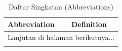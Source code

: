 \documentclass{elsinta}
\begin{document}
\section{\ReferencesTitle}

\renewcommand{\refname}{}




\section{\AbbrevTitle}

\begin{longtable}{|p{4cm}|p{11cm}|}
    \caption{Daftar Singkatan (Abbreviations)} \label{tab:abbreviations_el3} \\
    \hline
    \textbf{Abbreviation} & \textbf{Definition} \\
    \hline
    \endhead
    \hline 
    \multicolumn{2}{|r|}{Lanjutan di halaman berikutnya...} \\ 
    \endfoot
    \hline
    \endlastfoot
    

\end{longtable}
\end{document}
